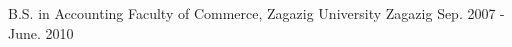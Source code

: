 

\begin{cventries}

  \cventry
    {B.S. in Accounting} %
    {Faculty of Commerce, Zagazig University} %
    {Zagazig} %
    {Sep. 2007 - June. 2010} %
    {
    }

\end{cventries}
